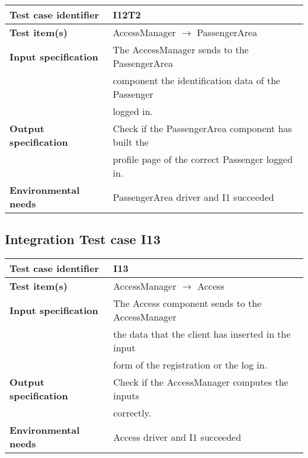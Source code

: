 		\vspace{1cm}
		\noindent
		\begin{adjustbox}{max width=\textwidth}
			\begin{tabular}{ l l}
				\hline 		\textbf{Test case identifier} & I12T2 \\
				\hline		\textbf{Test item(s)}  & AccessManager $\rightarrow$ PassengerArea \\
				\hline		\textbf{Input specification} &  The AccessManager sends to the PassengerArea\\ & component the identification data of the Passenger\\ & logged in.\\
				\hline		\textbf{Output specification} & Check if the PassengerArea component has built the\\ & profile page of the correct Passenger logged in.\\
				\hline		\textbf{Environmental needs} & PassengerArea driver and I1 succeeded\\
				\hline
			\end{tabular}
		\end{adjustbox}
	
	\hypertarget{chapter 3.13}{ }
	\subsection{Integration Test case I13}
		\begin{adjustbox}{max width=\textwidth}
			\begin{tabular}{ l l}
				\hline 		\textbf{Test case identifier} & I13 \\
				\hline		\textbf{Test item(s)}  & AccessManager $\rightarrow$ Access \\
				\hline		\textbf{Input specification} & The Access component sends to the AccessManager \\ & the data that the client has inserted in the input \\ & form of  the registration or the log in.\\
				\hline		\textbf{Output specification} & Check if the AccessManager computes the inputs\\ & correctly.\\
				\hline		\textbf{Environmental needs} & Access driver and I1 succeeded\\
				\hline
			\end{tabular}
		\end{adjustbox}
	
